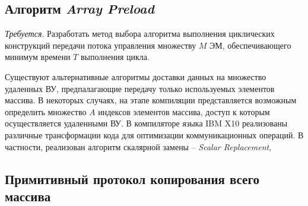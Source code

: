 \subsection{Алгоритм \textit{Array Preload}}





\textit{Требуется}. Разработать метод выбора алгоритма выполнения циклических
конструкций передачи потока управления множеству $M$ ЭМ, обеспечивающего минимум
времени $T$ выполнения цикла.


Существуют альтернативные алгоритмы доставки данных на множество удаленных ВУ,
предпалагающие передачу только используемых элементов массива. В некоторых
случаях, на этапе компиляции представляется возможным определить множество $A$
индексов элементов массива, доступ к которым осуществляется удаленными ВУ.
В компиляторе языка IBM X10 реализованы различные трансформации кода для
оптимизации коммуникационных операций. В частности, реализован алгоритм
скалярной замены -- \textit{Scalar Replacement}, 



\subsection{Примитивный протокол копирования всего массива}


